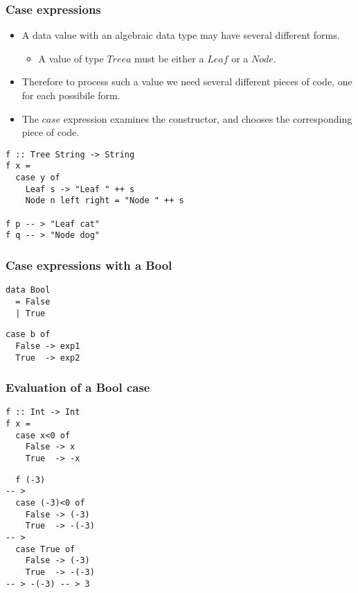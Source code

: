 \documentclass{beamer}
\begin{document}
\begin{frame}[fragile]
\frametitle{Case expressions}

\begin{itemize}
\item A data value with an algebraic data type may have
  several different forms.
  \begin{itemize}
  \item A value of type $Tree a$ must be either a $Leaf$ or a
    $Node$.
  \end{itemize}
\item Therefore to process such a value we need several different
  pieces of code, one for each possibile form.
\item The $case$ expression examines the constructor, and chooses
  the corresponding piece of code.
\end{itemize}

\begin{verbatim}
f :: Tree String -> String
f x =
  case y of
    Leaf s -> "Leaf " ++ s
    Node n left right = "Node " ++ s

f p -- > "Leaf cat"
f q -- > "Node dog"
\end{verbatim}

\end{frame}

\begin{frame}[fragile]
\frametitle{Case expressions with a Bool}

\begin{verbatim}
data Bool
  = False
  | True
\end{verbatim}

\begin{verbatim}
case b of
  False -> exp1
  True  -> exp2
\end{verbatim}

\end{frame}

\begin{frame}[fragile]
\frametitle{Evaluation of a Bool case}

\begin{verbatim}
f :: Int -> Int
f x =
  case x<0 of
    False -> x
    True  -> -x
  \end{verbatim}

\begin{verbatim}
  f (-3)
-- >
  case (-3)<0 of
    False -> (-3)
    True  -> -(-3)
-- >
  case True of
    False -> (-3)
    True  -> -(-3)
-- > -(-3) -- > 3
\end{verbatim}

\end{frame}
\end{document}
